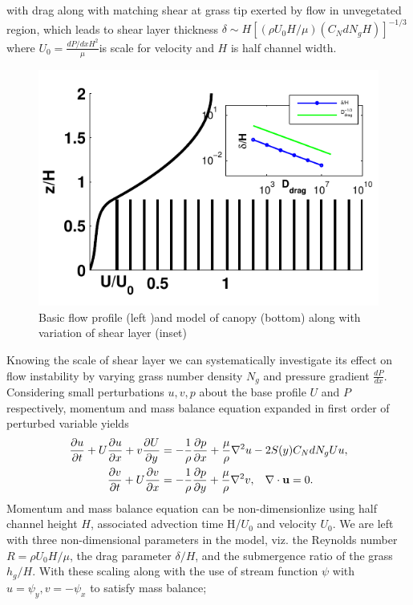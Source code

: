 \documentclass[aps,prl,twocolumn,showpacs,superscriptaddress,groupedaddress,10pt]{revtex4-1}  %
\newcommand{\bu}{\mathbf{u}}
\newcommand{\del}{\partial}
\begin{document}
with drag along with matching shear at grass tip exerted by flow in unvegetated region, which leads to shear layer 
thickness $\delta \sim  H\left[({\rho U_0 H}/\mu) (C_N d N_g H)\right]^{-1/3}$\normalsize where \small$U_0 = \frac{dP/dxH^2}{\mu}$\normalsize is scale for velocity and
$H$ is half channel width.
\begin{figure}[htb]
  \includegraphics[scale=0.8]{fig1}
\caption{Basic flow profile (left )and model of canopy (bottom) along with variation of shear layer (inset) }
\label{fig:basicflow}
\end{figure}
\newline
Knowing the scale of shear layer we can systematically investigate its effect on flow instability
by varying grass number density $N_g$ and pressure gradient $\frac{dP}{dx}$. Considering small perturbations $u, v, p$ about the base profile $U$ and $P$
respectively, momentum and mass balance equation expanded in first order of perturbed variable yields
\begin{equation}
\begin{split}
\frac{\del u}{\del t}+U\frac{\del u}{\del x}+v\frac{\del U}{\del y} &= -\frac{1}{\rho}\frac{\del p}{\del x}+\frac{\mu}{\rho}\nabla^2u-2S(y) C_{N}dN_{g}Uu, \\
\frac{\del v}{\del  t}+ U\frac{\del v}{\del x} &= -\frac{1}{\rho}\frac{\del p}{\del y}+\frac{\mu}{\rho}\nabla^2v, \hspace{0.3cm} \nabla\cdot\bu=0.
\end{split}
\end{equation}
Momentum and mass balance equation can be non-dimensionlize using half channel height $H$, associated advection time H/$U_0$ and velocity $U_0$. We are left with three non-dimensional parameters in the model, viz. the Reynolds number $R= {\rho U_0 H}/{\mu}$, the drag parameter $\delta/H$, and the submergence ratio of the grass $h_g/H$. With these scaling along with the use of stream function $\psi$ with $u = \psi_{y}, v= -\psi_x$ to satisfy mass balance; 
\end{document}
